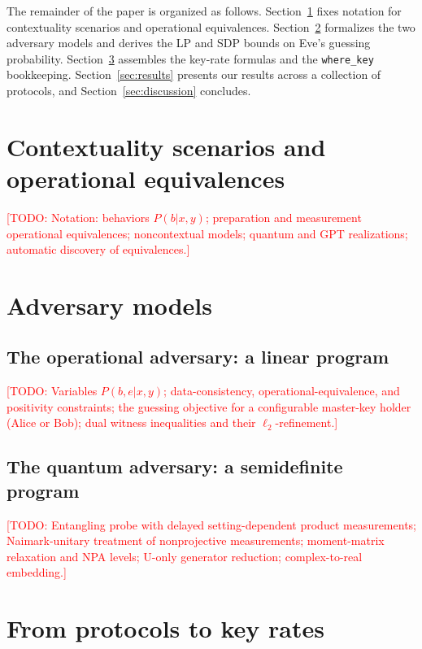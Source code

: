 \documentclass[aps,pra,twocolumn,superscriptaddress,longbibliography,nofootinbib]{revtex4-2}
\newcommand{\wherekey}{\texttt{where\_key}}
\newcommand{\todo}[1]{\textcolor{red}{[TODO: #1]}}
\begin{document}
The remainder of the paper is organized as follows.
Section~\ref{sec:scenarios} fixes notation for contextuality scenarios
and operational equivalences. Section~\ref{sec:adversaries} formalizes
the two adversary models and derives the LP and SDP bounds on Eve's
guessing probability. Section~\ref{sec:keyrates} assembles the key-rate
formulas and the \wherekey{} bookkeeping. Section~\ref{sec:results}
presents our results across a collection of protocols, and
Section~\ref{sec:discussion} concludes.

\section{Contextuality scenarios and operational equivalences}
\label{sec:scenarios}

\todo{Notation: behaviors $P(b|x,y)$; preparation and measurement
operational equivalences; noncontextual models; quantum and GPT
realizations; automatic discovery of equivalences.}

\section{Adversary models}
\label{sec:adversaries}

\subsection{The operational adversary: a linear program}
\label{sec:lp}

\todo{Variables $P(b,e|x,y)$; data-consistency, operational-equivalence,
and positivity constraints; the guessing objective for a configurable
master-key holder (Alice or Bob); dual witness inequalities and their
$\ell_2$-refinement.}

\subsection{The quantum adversary: a semidefinite program}
\label{sec:sdp}

\todo{Entangling probe with delayed setting-dependent product
measurements; Naimark-unitary treatment of nonprojective measurements;
moment-matrix relaxation and NPA levels; U-only generator reduction;
complex-to-real embedding.}

\section{From protocols to key rates}
\label{sec:keyrates}
\end{document}
